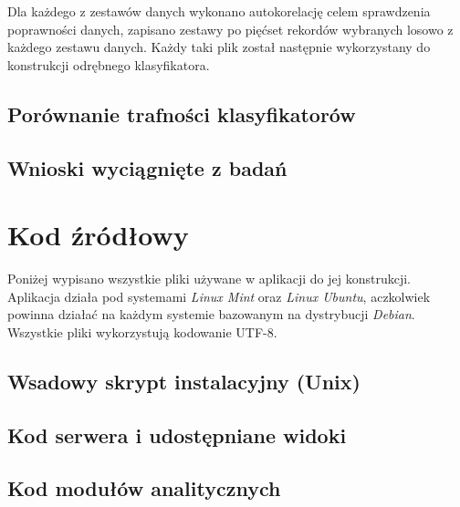 \documentclass[12pt,a4paper,oneside]{report} %
\begin{document}
Dla każdego z zestawów danych wykonano autokorelację celem sprawdzenia poprawności danych, zapisano zestawy po pięćset rekordów wybranych losowo z każdego zestawu danych. Każdy taki plik został następnie wykorzystany do konstrukcji odrębnego klasyfikatora.\par

\section{Porównanie trafności klasyfikatorów}

\section{Wnioski wyciągnięte z badań}











\chapter{Kod źródłowy}
Poniżej wypisano wszystkie pliki używane w aplikacji do jej konstrukcji. Aplikacja działa pod systemami \emph{Linux Mint} oraz \emph{Linux Ubuntu}, aczkolwiek powinna działać na każdym systemie bazowanym na dystrybucji \emph{Debian}. Wszystkie pliki wykorzystują kodowanie UTF-8.
\section{Wsadowy skrypt instalacyjny (Unix)}
%
%
\section{Kod serwera i udostępniane widoki}
%
%
%
%
%
%
%
%
\section{Kod modułów analitycznych}
\end{document}
